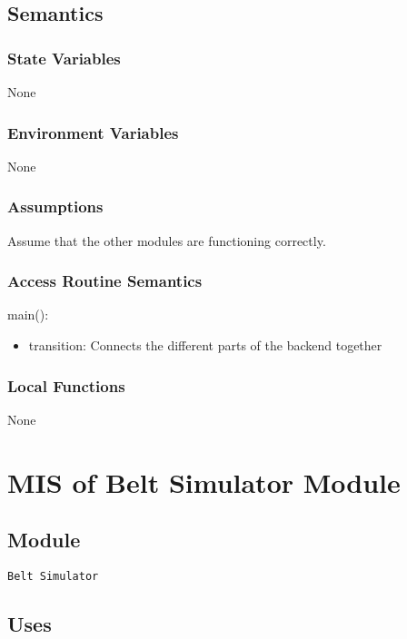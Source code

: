 \documentclass[12pt, titlepage]{article}
\begin{document}
\subsection{Semantics}

\subsubsection{State Variables}

None

\subsubsection{Environment Variables}

None

\subsubsection{Assumptions}
Assume that the other modules are functioning correctly.

\subsubsection{Access Routine Semantics}

\noindent main():
\begin{itemize}
\item transition: Connects the different parts of the backend together
\end{itemize}

\subsubsection{Local Functions}

None

\newpage

\section{MIS of Belt Simulator Module} \label{Module_belt_simulator}

\subsection{Module}

\texttt{Belt Simulator}

\subsection{Uses}
\end{document}
